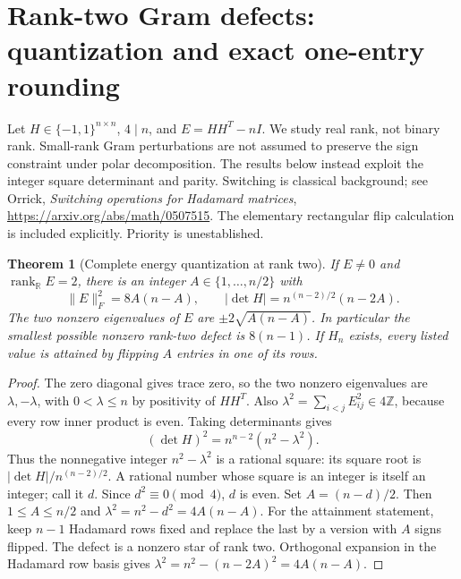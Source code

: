 \documentclass[11pt]{article}
\newtheorem{theorem}{Theorem}[section]
\begin{document}
\section{Rank-two Gram defects: quantization and exact one-entry rounding}
\label{sec:spectral-rank-two}
Let $H\in\{-1,1\}^{n\times n}$, $4\mid n$, and
$E=HH^T-nI$. We study real rank, not binary rank. Small-rank Gram
perturbations are not assumed to preserve the sign constraint under
polar decomposition. The results below instead exploit the integer
square determinant and parity. Switching is classical background; see
Orrick, \emph{Switching operations for Hadamard matrices},
\url{https://arxiv.org/abs/math/0507515}. The elementary rectangular
flip calculation is included explicitly. Priority is unestablished.

\begin{theorem}[Complete energy quantization at rank two]
\label{thm:spectral-quantization}
If $E\ne0$ and $\operatorname{rank}_{\mathbb R}E=2$, there is an integer
$A\in\{1,\ldots,n/2\}$ with
\[
 \|E\|_F^2=8A(n-A),\qquad
 |\det H|=n^{(n-2)/2}(n-2A).
\]
The two nonzero eigenvalues of $E$ are
$\pm2\sqrt{A(n-A)}$. In particular the smallest possible nonzero
rank-two defect is $8(n-1)$. If $H_n$ exists, every listed value is
attained by flipping $A$ entries in one of its rows.
\end{theorem}
\begin{proof}
The zero diagonal gives trace zero, so the two nonzero eigenvalues are
$\lambda,-\lambda$, with $0<\lambda\le n$ by positivity of $HH^T$.
Also $\lambda^2=\sum_{i<j}E_{ij}^2\in4\mathbb Z$, because every
row inner product is even. Taking determinants gives
\[
 (\det H)^2=n^{n-2}(n^2-\lambda^2).
\]
Thus the nonnegative integer $n^2-\lambda^2$ is a rational square:
its square root is $|\det H|/n^{(n-2)/2}$. A rational number whose
square is an integer is itself an integer; call it $d$. Since
$d^2\equiv0\pmod4$, $d$ is even. Set $A=(n-d)/2$.
Then $1\le A\le n/2$ and $\lambda^2=n^2-d^2=4A(n-A)$.
For the attainment statement, keep $n-1$ Hadamard rows fixed and replace
the last by a version with $A$ signs flipped. The defect is a nonzero
star of rank two. Orthogonal expansion in the Hadamard row basis gives
$\lambda^2=n^2-(n-2A)^2=4A(n-A)$.
\end{proof}
\end{document}
